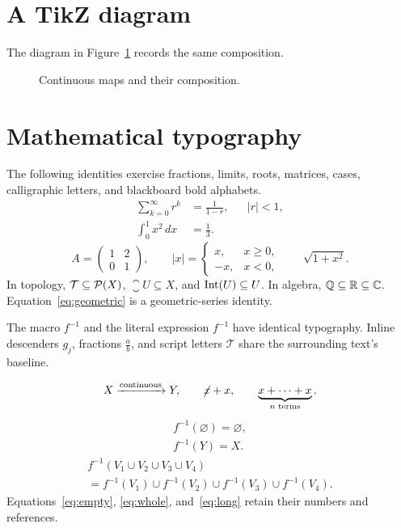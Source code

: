 \documentclass[11pt]{article}
\newcommand{\inv}[1]{#1^{-1}}
\begin{document}
\section{A TikZ diagram}
The diagram in Figure~\ref{fig:composition} records the same composition.
\begin{figure}[ht]
\centering
{}
\caption{Continuous maps and their composition.}\label{fig:composition}
\end{figure}

\section{Mathematical typography}
The following identities exercise fractions, limits, roots, matrices,
cases, calligraphic letters, and blackboard bold alphabets.
\begin{align}
  \sum_{k=0}^{\infty}r^k &= \frac{1}{1-r}, && |r|<1,\label{eq:geometric}\\
  \int_0^1 x^2\,dx &= \frac13.\nonumber
\end{align}
\[
  A=\begin{pmatrix}1&2\\0&1\end{pmatrix},\qquad
  |x|=\begin{cases}x,&x\geq0,\\-x,&x<0,\end{cases}
  \qquad \sqrt{1+x^2}.
\]
In topology, $\mathcal{T}\subseteq\mathcal{P}(X)$, $\closure{U}\subseteq X$,
and $\operatorname{Int}(U)\subseteq U$. In algebra, $\mathbb{Q}\subseteq\mathbb{R}\subseteq\mathbb{C}$.
Equation~\eqref{eq:geometric} is a geometric-series identity.

\begin{example}
The macro $\inv{f}$ and the literal expression $f^{-1}$ have identical
typography. Inline descenders $g_j$, fractions $\frac{a}{b}$, and script
letters $\mathcal{T}$ share the surrounding text's baseline.
\end{example}
\[
  X\xrightarrow{\text{continuous}}Y,
  \qquad \cancel{x}+x,
  \qquad \underbrace{x+\cdots+x}_{n\text{ terms}}.
\]
\begin{gather}
  \inv{f}(\varnothing)=\varnothing,\label{eq:empty}\\
  \inv{f}(Y)=X.\label{eq:whole}
\end{gather}
\begin{multline}\label{eq:long}
  \inv{f}(V_1\cup V_2\cup V_3\cup V_4)\\
  =\inv{f}(V_1)\cup\inv{f}(V_2)\cup\inv{f}(V_3)\cup\inv{f}(V_4).
\end{multline}
Equations~\eqref{eq:empty}, \eqref{eq:whole}, and~\eqref{eq:long}
retain their numbers and references.
\end{document}
